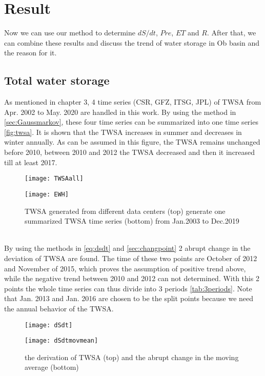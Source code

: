 \chapter{Result}
Now we can use our method to determine $dS/dt$, $Pre$, $ET$ and $R$. After that, we can combine these results and discuss the trend of water storage in Ob basin and the reason for it.
\section{Total water storage}
As mentioned in chapter 3, 4 time series (CSR, GFZ, ITSG, JPL) of TWSA from Apr. 2002 to May. 2020 are handled in this work. By using the method in \autoref{sec:Gaussmarkov}, these four time series can be summarized into one time series \autoref{fig:twsa}. It is shown that the TWSA increases in summer and decreases in winter annually. As can be assumed in this figure, the TWSA remains unchanged before 2010, between 2010 and 2012 the TWSA decreased and then it increased till at least 2017.   \\
\begin{figure}[htbp]\centering
	\begin{minipage}[t]{0.85\textwidth}
		\centering
		\texttt{[image: TWSAall]} %
	\end{minipage}
	\begin{minipage}[t]{0.85\textwidth}
		\centering
		\texttt{[image: EWH]} %
	\end{minipage}
	\caption{TWSA generated from different data centers (top) generate one summarized TWSA time series (bottom) from Jan.2003 to Dec.2019}
	\label{fig:twsa}
\end{figure}\\
By using the methods in \autoref{eq:dsdt} and \autoref{sec:changpoint} 2 abrupt change in the deviation of TWSA are found. The time of these two points are October of 2012 and November of 2015, which proves the assumption of positive trend above, while the negative trend between 2010 and 2012 can not determined. With this 2 points the whole time series can thus divide into 3 periods \autoref{tab:3periods}. Note that Jan. 2013 and Jan. 2016 are chosen to be the split points because we need the annual behavior of the TWSA. 
\begin{figure}[htbp]\centering
	\begin{minipage}[t]{0.7\textwidth}
		\centering
		\texttt{[image: dSdt]} %
	\end{minipage}
	\begin{minipage}[t]{0.7\textwidth}
		\centering
		\texttt{[image: dSdtmovmean]} %
	\end{minipage}
	\caption{the derivation of TWSA (top) and the abrupt change in the moving average (bottom)}
	\label{fig:dsdt}
\end{figure}

